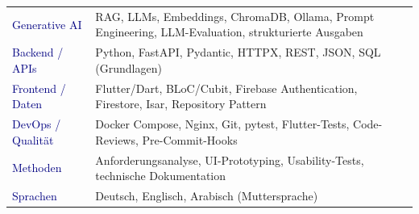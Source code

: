 \begin{tabularx}{\linewidth}{@{}p{30mm}X@{}}

\textcolor{navy}{Generative AI} &
RAG, LLMs, Embeddings, ChromaDB,
Ollama, Prompt Engineering,
LLM-Evaluation, strukturierte Ausgaben \\

\textcolor{navy}{Backend / APIs} &
Python, FastAPI, Pydantic,
HTTPX, REST, JSON, SQL (Grundlagen) \\

\textcolor{navy}{Frontend / Daten} &
Flutter/Dart, BLoC/Cubit,
Firebase Authentication, Firestore,
Isar, Repository Pattern \\

\textcolor{navy}{DevOps / Qualität} &
Docker Compose, Nginx, Git,
pytest, Flutter-Tests,
Code-Reviews, Pre-Commit-Hooks \\

\textcolor{navy}{Methoden} &
Anforderungsanalyse, UI-Prototyping,
Usability-Tests, technische Dokumentation \\

\textcolor{navy}{Sprachen} &
Deutsch, Englisch,
Arabisch (Muttersprache) \\

\end{tabularx}

\endgroup


